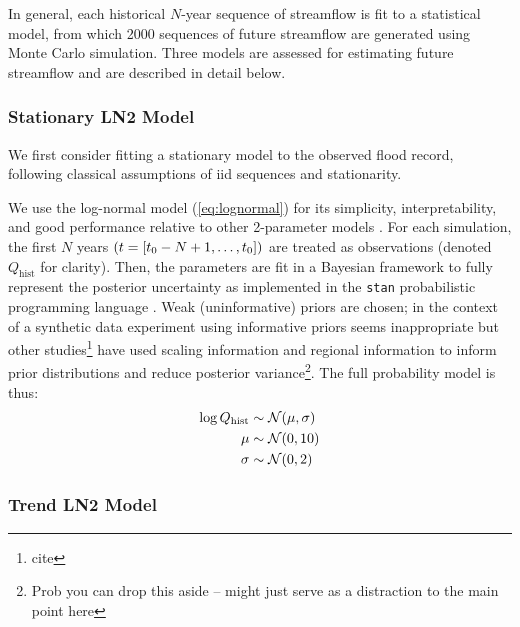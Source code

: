 \documentclass[12pt]{article}
\begin{document}
In general, each historical $N$-year sequence of streamflow is fit to a statistical model, from which 2000 sequences of future streamflow are generated using Monte Carlo simulation.
Three models are assessed for estimating future streamflow and are described in detail below.

\subsubsection{Stationary LN2 Model\label{sec:method-stationary}}

We first consider fitting a stationary model to the observed flood record, following classical assumptions of \gls{iid} sequences and stationarity.

We use the log-normal model (\cref{eq:lognormal}) for its simplicity, interpretability, and good performance relative to other 2-parameter models \citep{Vogel1996}.
For each simulation, the first $N$ years \(\qty(t=[t_0-N+1, \ldots, t_0])\) are treated as observations (denoted \(Q_{\text{hist}}\) for clarity).
Then, the parameters are fit in a Bayesian framework to fully represent the posterior uncertainty as implemented in the \texttt{stan} probabilistic programming language \citep{Carpenter2016}.
Weak (uninformative) priors are chosen; in the context of a synthetic data experiment using informative priors seems inappropriate but other studies\footnote{cite} have used scaling information and regional information to inform prior distributions and reduce posterior variance\footnote{Prob you can drop this aside -- might just serve as a distraction to the main point here}.
The full probability model is thus:
\begin{align}
  \log Q_\text{hist} & \sim \mathcal{N} \qty(\mu, \sigma) \\
  \mu &\sim \mathcal{N} \qty(0, 10) \\
  \sigma &\sim \mathcal{N} \qty(0, 2)
\end{align}

\subsubsection{Trend LN2 Model\label{sec:method-trend}}
\end{document}
